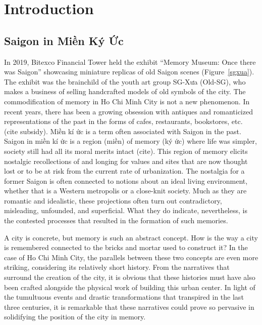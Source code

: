\chapter{Introduction}\label{intro}
\vi
\section{Saigon in Miền Ký Ức}
\vi In 2019, Bitexco Financial Tower held the exhibit “Memory Museum: Once there was Saigon” showcasing miniature replicas of old Saigon scenes (Figure~\ref{sgxua}). The exhibit was the brainchild of the youth art group SG-Xưa (Old-SG), who makes a business of selling handcrafted models of old symbols of the city. The commodification of memory in Ho Chi Minh City is not a new phenomenon. In recent years, there has been a growing obsession with antiques and romanticized representations of the past in the forms of cafes, restaurants, bookstores, etc. (cite subsidy). Miền kí ức is a term often associated with Saigon in the past. Saigon in miền kí ức is a region (miền) of memory (ký ức) where life was simpler, society still had all its moral merits intact (cite).  This region of memory elicits nostalgic recollections of and longing for values and sites that are now thought lost or to be at risk from the current rate of urbanization.  The nostalgia for a former Saigon is often connected to notions about an ideal living environment, whether that is a Western metropolis or a close-knit society. Much as they are romantic and idealistic, these projections often turn out contradictory, misleading, unfounded, and superficial. What they do indicate, nevertheless, is the contested processes that resulted in the formation of such memories.
\en

\begin{figure}[!ht]
\end{figure}

\vi A city is concrete, but memory is such an abstract concept. How is the way a city is remembered connected to the bricks and mortar used to construct it? In the case of Ho Chi Minh City, the parallels between these two concepts are even more striking, considering its relatively short history.  From the narratives that surround the creation of the city, it is obvious that these histories must have also been crafted alongside the physical work of building this urban center. In light of the tumultuous events and drastic transformations that transpired in the last three centuries, it is remarkable that these narratives could prove so pervasive in solidifying the position of the city in memory.

